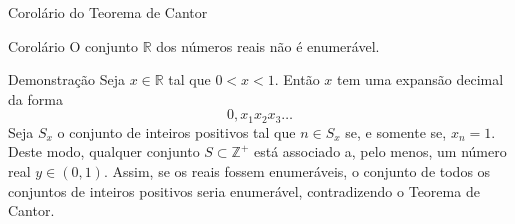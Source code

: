 \begin{frame}[fragile]{Corolário do Teorema de Cantor}

    \begin{block}{Corolário}
        O conjunto $\mathbb{R}$ dos números reais não é enumerável.
    \end{block}

    \begin{block}{Demonstração}
        Seja $x\in\mathbb{R}$ tal que $0 < x < 1$. Então $x$ tem uma expansão decimal da forma
        \[
            0,x_1x_2x_3\ldots
        \]
        Seja $S_x$ o conjunto de inteiros positivos tal que $n\in S_x$ se, e somente se, 
            $x_n = 1$. Deste modo, qualquer conjunto $S\subset \mathbb{Z}^+$ está associado a,
            pelo menos, um número real $y\in (0, 1)$. Assim, se os reais fossem enumeráveis,
            o conjunto de todos os conjuntos de inteiros positivos seria enumerável, contradizendo
            o Teorema de Cantor.
            
    \end{block}
\end{frame}
